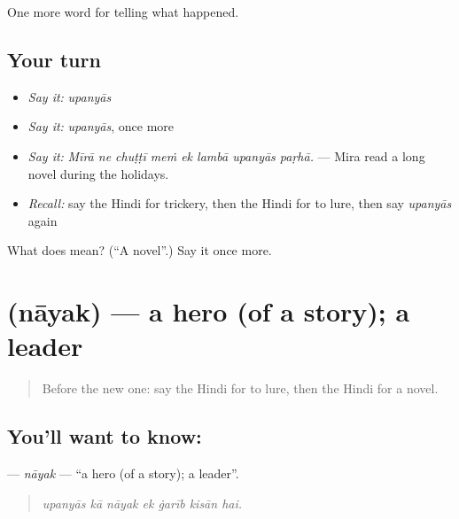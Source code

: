 \begin{grammarlens}[title={What you've built}]
One more word for telling what happened.
\end{grammarlens}

\subsection*{Your turn}
\begin{itemize}
\raggedright
  \item \emph{Say it:} \emph{upanyās}
  \item \emph{Say it:} \emph{upanyās}, once more
  \item \emph{Say it:} \emph{Mīrā ne chuṭṭī meṁ ek lambā upanyās paṛhā.} — Mira read a long novel during the holidays.
  \item \emph{Recall:} say the Hindi for trickery, then the Hindi for to lure, then say \emph{upanyās} again
\end{itemize}

\begin{tcolorbox}[breakable,colback=teal!4,colframe=teal!35!black,title={Before you move on}]
What does  mean? (\textquotedblleft{}A novel\textquotedblright{}.) Say it once more.
\end{tcolorbox}
\section[\texorpdfstring{\hi{नायक} (nāyak)}{नायक (nāyak)}]{ (nāyak) — a hero (of a story); a leader}

\label{lesson:HI-C340-nayak}



\begin{quote}
Before the new one: say the Hindi for to lure, then the Hindi for a novel.
\end{quote}

\subsection*{You'll want to know: }
\textbf{} — \emph{nāyak} — \textquotedblleft{}a hero (of a story); a leader\textquotedblright{}.

\begin{quote}
      
\end{quote}

\begin{quote}
\emph{upanyās kā nāyak ek ġarīb kisān hai.}
\end{quote}

